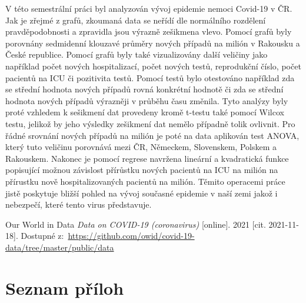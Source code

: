 \documentclass[a4paper, 12pt]{article}
\begin{document}
V této semestrální práci byl analyzován vývoj epidemie nemoci Covid-19 v ČR.
Jak je zřejmé z grafů, zkoumaná data se neřídí dle normálního rozdělení pravděpodobnosti
a zpravidla jsou výrazně zešikmena vlevo. Pomocí grafů byly porovnány sedmidenní klouzavé
průměry nových případů na milión v Rakousku a České republice. Pomocí grafů byly
také vizualizovány další veličiny jako například počet nových hospitalizací, počet nových testů,
reprodukční číslo, počet pacientů na ICU či pozitivita testů. Pomocí testů bylo otestováno například
zda se střední hodnota nových případů rovná konkrétní hodnotě či zda se střední hodnota
nových případů výrazněji v průběhu času změnila. Tyto analýzy byly proté vzhledem k sešikmení dat
provedeny kromě t-testu také pomocí Wilcox testu, jelikož by jeho výsledky zešikmení dat nemělo
případně tolik ovlivnit. Pro řádné srovnání nových případů na milión je poté na data aplikován
test ANOVA, který tuto veličinu porovnává mezi ČR, Německem, Slovenskem, Polskem a Rakouskem.
Nakonec je pomocí regrese navržena lineární a kvadratická funkce popisující možnou závislost
přírůstku nových pacientů na ICU na milión na přírustku nově hospitalizovaných pacientů na milión.
Těmito operacemi práce jistě poskytuje bližší pohled na vývoj současné epidemie v naší zemi
jakož i nebezpečí, které tento virus představuje.


\clearpage {} {}

\begin{thebibliography}{99}	%


Our World in Data
\textit{Data on COVID-19 (coronavirus)} [online]. 2021 [cit. 2021-11-18]. Dostupné z:~\url{https://github.com/owid/covid-19-data/tree/master/public/data}

\end{thebibliography}


\clearpage {} {}
\section*{Seznam příloh}
\end{document}
